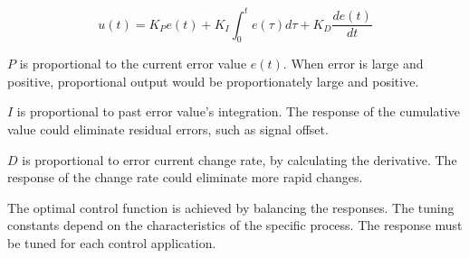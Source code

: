 \documentclass[\main/master.tex]{subfiles}
\begin{document}
\begin{equation}
u(t) = K_P e(t)+K_I\int_{0}^{t}e(\tau)d\tau+K_D\frac{de(t)}{dt}   \label{eqn:PID response}
\end{equation}

\noindent
$P$ is proportional to the current error value $e(t)$. When error is large and positive, proportional output would be proportionately large and positive.
\par\noindent
$I$ is proportional to past error value's integration. The response of the cumulative value could eliminate residual errors, such as signal offset.
\par\noindent
$D$ is proportional to error current change rate, by calculating the derivative. The response of the change rate could eliminate more rapid changes.
\par\noindent
The optimal control function is achieved by balancing the responses. The tuning constants depend on the characteristics of the specific process. The response must be tuned for each control application.  
\end{document}
